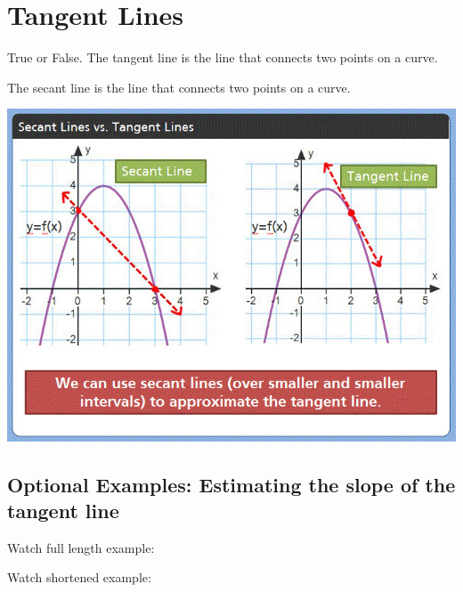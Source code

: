 \documentclass{ximera}
\begin{document}
\section{Tangent Lines}


\begin{question}
  True or False. The tangent line is the line that connects two points on a curve. 
  \begin{multipleChoice}
  \end{multipleChoice}
  \begin{feedback}
  The secant line is the line that connects two points on a curve.
  \end{feedback}
\end{question}

\begin{image}
\includegraphics{picture6.jpg}
\end{image}

\subsection{Optional Examples: Estimating the slope of the tangent line}

Watch full length example:
\begin{foldable}
\end{foldable}

Watch shortened example: 
\begin{foldable}
\end{foldable}
\end{document}
